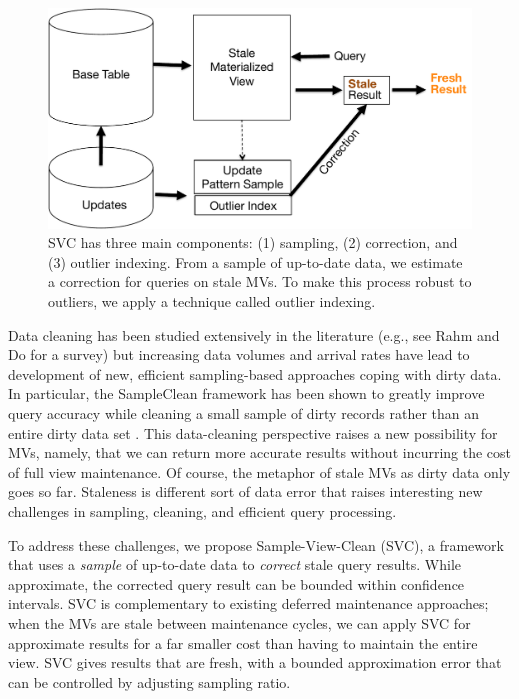 \begin{figure}[t] \vspace{-1.5em}
\centering
 \includegraphics[scale=0.30]{figs/sys-arch.pdf}
 \caption{SVC has three main components: (1) sampling, (2) correction, and (3) outlier indexing. From a sample of up-to-date data, we estimate
 a correction for queries on stale MVs. To make this process robust to outliers, we apply a technique called outlier indexing. \label{sys-arch}}\vspace{-1.5em}
\end{figure}

Data cleaning has been studied extensively in the literature (e.g., see Rahm and Do for a survey\cite{rahm2000data}) but increasing data volumes and arrival rates have lead to development of new, efficient sampling-based approaches coping with dirty data.   In particular, the SampleClean framework has been shown to greatly improve query accuracy while cleaning a small sample of dirty records rather than an entire dirty data set \cite{wang1999sample}.  This data-cleaning perspective raises a new possibility for MVs, namely, that we can return more accurate results without incurring the cost of full view maintenance.   Of course, the metaphor of stale MVs as dirty data only goes so far. Staleness is different sort of data error that raises interesting new challenges in sampling, cleaning, and efficient query processing.

To address these challenges, we propose Sample-View-Clean (SVC), a framework that uses a \emph{sample} of up-to-date data to \emph{correct} stale query results.  While approximate, the corrected query result can be bounded within confidence intervals.
SVC is complementary to existing deferred maintenance approaches; when the MVs are stale between maintenance cycles, we can apply SVC for approximate results for a far smaller cost than having to maintain the entire view.
SVC gives results that are fresh, with a bounded approximation error that can be controlled by adjusting sampling ratio.


